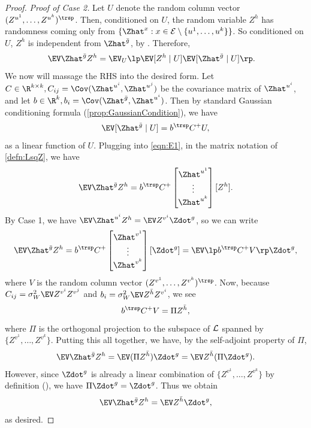 \documentclass[main.tex]{subfiles}
\begin{document}
\begin{proof}
  \emph{Proof of Case 2.}
  Let $U$ denote the random column vector $(Z^{\uu^1}, \ldots, Z^{\uu^k})^\trsp$.
  Then, conditioned on $U$, the random variable $Z^h$ has randomness coming only from $\{\Zhat^\xx: \xx \in \Ee \setminus \{\uu^1, \ldots, \uu^k\}\}$.
  So conditioned on $U$, $Z^h$ is independent from $\Zhat^{\bar g}$, by .
  Therefore,
  \begin{align}
    \EV \Zhat^{\bar g} Z^h
    &=
      \EV_{U}\lp
      \EV [ Z^h \mid U]
      \EV [ \Zhat^{\bar g} \mid U]
      \rp
      .  \label{eqn:E1}
  \end{align}
  We now will massage the RHS into the desired form.
  Let $C \in \R^{k\times k}, C_{ij} = \Cov(\Zhat^{u^i}, \Zhat^{u^j})$ be the covariance matrix of $\Zhat^{u^i}$, and let $b \in \R^k, b_i = \Cov(\Zhat^{\bar g}, \Zhat^{u^i})$.
  Then by standard Gaussian conditioning formula (\cref{prop:GaussianCondition}), we have
  \begin{align*}
    \EV [ \Zhat^{\bar g} \mid U] = b^\trsp C^+ U,
  \end{align*}
  as a linear function of $U$.
  Plugging into \cref{eqn:E1}, in the matrix notation of \cref{defn:LsqZ}, we have
  \begin{align*}
    \EV \Zhat^{\bar g} Z^h = b^\trsp C^+ 
    \begin{bmatrix}
    \Zhat^{\uu^1}\\
    \vdots\\
    \Zhat^{\uu^k}
    \end{bmatrix}
    [Z^{h}]
    .
  \end{align*}
  By Case 1, we have $\EV \Zhat^{\uu^{i}} Z^{h} = \EV Z^{\vv^{i}} \Zdot^{g}$, so we can write
  \begin{align*}
    \EV \Zhat^{\bar g} Z^h = b^\trsp C^+ 
    \begin{bmatrix}
    \Zhat^{\vv^1}\\
    \vdots\\
    \Zhat^{\vv^k}
    \end{bmatrix}
    [\Zdot^{g}]
    = \EV \lp b^\trsp C^+ V \rp \Zdot^g
    ,
  \end{align*}
  where $V$ is the random column vector $(Z^{v^1}, \ldots, Z^{v^k})^\trsp$.
  Now, because $C_{ij} = \sigma_W^2 \EV Z^{v^i} Z^{v^j}$ and $b_i = \sigma_W^2 \EV Z^{\bar h} Z^{v^i}$, we see
  \[b^\trsp C^+ V
  = \Pi Z^{\bar h},\]
  where $\Pi$ is the orthogonal projection to the subspace of $\mathcal{L}$ spanned by $\{Z^{v^1}, \ldots, Z^{v^k}\}$.
  Putting this all together, we have, by the self-adjoint property of $\Pi$,
  \begin{align*}
    \EV \Zhat^{\bar g} Z^h = \EV (\Pi Z^{\bar h}) \Zdot^g = \EV Z^{\bar h} (\Pi \Zdot^g).
  \end{align*}
  However, since $\Zdot^g$ is already a linear combination of $\{Z^{v^1}, \ldots, Z^{v^k}\}$ by definition (), we have $\Pi \Zdot^g = \Zdot^g$.
  Thus we obtain
  \begin{align*}
    \EV \Zhat^{\bar g} Z^h = \EV Z^{\bar h} \Zdot^g,
  \end{align*}
  as desired.
\end{proof}
\end{document}
